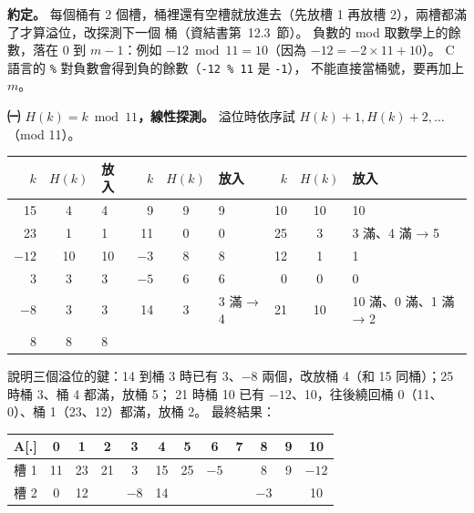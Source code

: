\begin{pastsoln}
\textbf{約定。} 每個桶有 2 個槽，桶裡還有空槽就放進去（先放槽 1 再放槽 2），兩槽都滿了才算溢位，改探測下一個
桶（資結書第~12.3~節）。 負數的 mod 取數學上的餘數，落在 0 到 $m-1$：例如 $-12 \bmod 11 = 10$（因為
$-12 = -2 \times 11 + 10$）。 C 語言的 \texttt{\%} 對負數會得到負的餘數（\texttt{-12 \% 11} 是 \texttt{-1}），
不能直接當桶號，要再加上 $m$。

\textbf{㈠ $H(k) = k \bmod 11$，線性探測。} 溢位時依序試 $H(k)+1, H(k)+2, \dots$（mod 11）。
\begin{center}
\small
\begin{tabular}{rclrclrcl}
\toprule
$k$ & $H(k)$ & 放入 & $k$ & $H(k)$ & 放入 & $k$ & $H(k)$ & 放入 \\
\midrule
15 & 4 & 4 & 9 & 9 & 9 & 10 & 10 & 10 \\
23 & 1 & 1 & 11 & 0 & 0 & 25 & 3 & 3 滿、4 滿 → 5 \\
$-12$ & 10 & 10 & $-3$ & 8 & 8 & 12 & 1 & 1 \\
3 & 3 & 3 & $-5$ & 6 & 6 & 0 & 0 & 0 \\
$-8$ & 3 & 3 & 14 & 3 & 3 滿 → 4 & 21 & 10 & 10 滿、0 滿、1 滿 → 2 \\
8 & 8 & 8 & & & & & & \\
\bottomrule
\end{tabular}
\end{center}
說明三個溢位的鍵：14 到桶 3 時已有 3、$-8$ 兩個，改放桶 4（和 15 同桶）；25 時桶 3、桶 4 都滿，放桶 5；
21 時桶 10 已有 $-12$、10，往後繞回桶 0（11、0）、桶 1（23、12）都滿，放桶 2。 最終結果：
\begin{center}
\begin{tabular}{|c|*{11}{c|}}
\hline
A[.] & 0 & 1 & 2 & 3 & 4 & 5 & 6 & 7 & 8 & 9 & 10 \\
\hline
槽 1 & 11 & 23 & 21 & 3 & 15 & 25 & $-5$ & & 8 & 9 & $-12$ \\
\hline
槽 2 & 0 & 12 & & $-8$ & 14 & & & & $-3$ & & 10 \\
\hline
\end{tabular}
\end{center}


\end{pastsoln}
